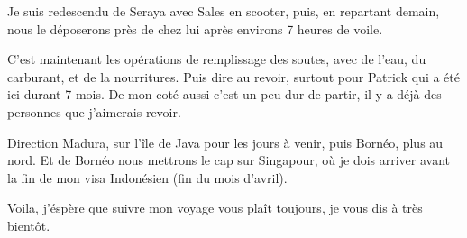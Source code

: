 \begin{multicols}{2}
Je suis redescendu de Seraya avec Sales en scooter, puis, en repartant demain, nous le déposerons près de chez lui après environs 7 heures de voile.

C'est maintenant les opérations de remplissage des soutes, avec de l'eau, du carburant, et de la nourritures. Puis dire au revoir, surtout pour Patrick qui a été ici durant 7 mois. De mon coté aussi c'est un peu dur de partir, il y a déjà des personnes que j'aimerais revoir.

Direction Madura, sur l'île de Java pour les jours à venir, puis Bornéo, plus au nord. Et de Bornéo nous mettrons le cap sur Singapour, où je dois arriver avant la fin de mon visa Indonésien (fin du mois d'avril).

Voila, j'éspère que suivre mon voyage vous plaît toujours, je vous dis à très bientôt.

\end{multicols}
